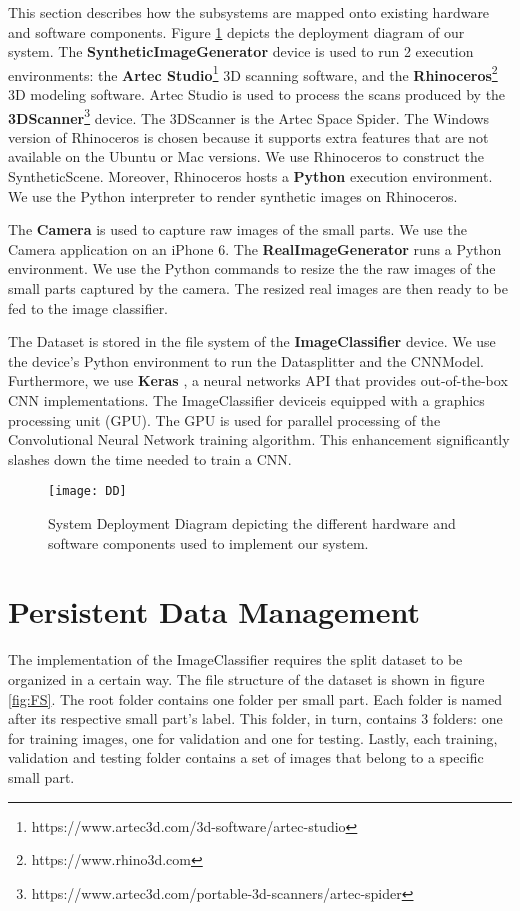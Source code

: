 This section describes how the subsystems are mapped onto existing hardware and software components. Figure \ref{fig:DD} depicts the deployment diagram of our system. The \textbf{SyntheticImageGenerator} device is used to run 2 execution environments: the \textbf{Artec Studio}\footnote{https://www.artec3d.com/3d-software/artec-studio} 3D scanning software, and the \textbf{Rhinoceros}\footnote{https://www.rhino3d.com} 3D modeling software. Artec Studio is used to process the scans produced by the \textbf{3DScanner}\footnote{https://www.artec3d.com/portable-3d-scanners/artec-spider} device. The 3DScanner is the Artec Space Spider. The Windows version of Rhinoceros is chosen because it supports extra features that are not available on the Ubuntu or Mac versions. We use Rhinoceros to construct the SyntheticScene. Moreover, Rhinoceros hosts a \textbf{Python} execution environment. We use the Python interpreter to render synthetic images on Rhinoceros.

The \textbf{Camera} is used to capture raw images of the small parts. We use the Camera application on an iPhone 6. The \textbf{RealImageGenerator} runs a Python environment. We use the Python commands to resize the the raw images of the small parts captured by the camera. The resized real images are then ready to be fed to the image classifier.

The Dataset is stored in the file system of the \textbf{ImageClassifier} device. We use the device's Python environment to run the Datasplitter and the CNNModel. Furthermore, we use \textbf{Keras} \cite{chollet2015keras}, a neural networks API that provides out-of-the-box CNN implementations. The ImageClassifier deviceis equipped with a graphics processing unit (GPU). The GPU is used for parallel processing of the Convolutional Neural Network training algorithm. This enhancement significantly slashes down the time needed to train a CNN.

\begin{figure}[h]
\centering
  \texttt{[image: DD]}
\caption{System Deployment Diagram depicting the different hardware and software components used to implement our system.}
\label{fig:DD}
\end{figure}

\section{Persistent Data Management}\label{sec:persistent_data_management}

The implementation of the ImageClassifier requires the split dataset to be organized in a certain way. The file structure of the dataset is shown in figure \ref{fig:FS}. The root folder contains one folder per small part. Each folder is named after its respective small part's label. This folder, in turn, contains 3 folders: one for training images, one for validation and one for testing. Lastly, each training, validation and testing folder contains a set of images that belong to a specific small part.

